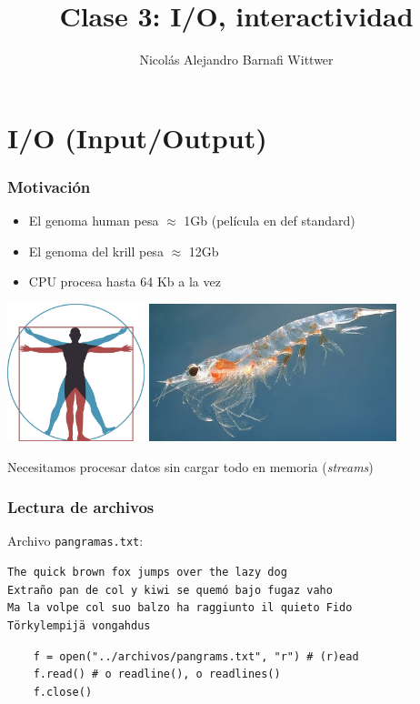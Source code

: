 \documentclass[14pt,aspectratio=169,xcolor=dvipsnames]{beamer}
\title[short title]{Clase 3: I/O, interactividad}
\subtitle{}
\author[NA Barnafi] {Nicolás Alejandro Barnafi Wittwer}
\institute[UC|CMM] 
{
    Pontificia Universidad Católica de Chile \\
    Centro de Modelamiento Matemático
}
\date{}
\begin{document}
\begin{frame}
    \maketitle
\end{frame}
\section{I/O (Input/Output)}
\begin{frame}\frametitle{Motivación}
    \begin{itemize}
        \item El genoma human pesa $\approx$ 1Gb (película en def standard)
        \item El genoma del krill pesa $\approx$ 12Gb
        \item CPU procesa hasta 64 Kb a la vez
    \end{itemize}
    \hspace{2cm}\includegraphics[height=4cm]{../images/vitruvio.jpg}
    \includegraphics[height=4cm]{../images/krill.jpg}

\pause Necesitamos procesar datos sin cargar todo en memoria (\emph{streams})
\end{frame}
\begin{frame}[fragile]\frametitle{Lectura de archivos}
Archivo \texttt{pangramas.txt}:
    \begin{verbatim}
The quick brown fox jumps over the lazy dog
Extraño pan de col y kiwi se quemó bajo fugaz vaho
Ma la volpe col suo balzo ha raggiunto il quieto Fido
Törkylempijä vongahdus
    \end{verbatim}

    \begin{verbatim}
    f = open("../archivos/pangrams.txt", "r") # (r)ead
    f.read() # o readline(), o readlines()
    f.close()
    \end{verbatim}
\end{frame}
\end{document}
